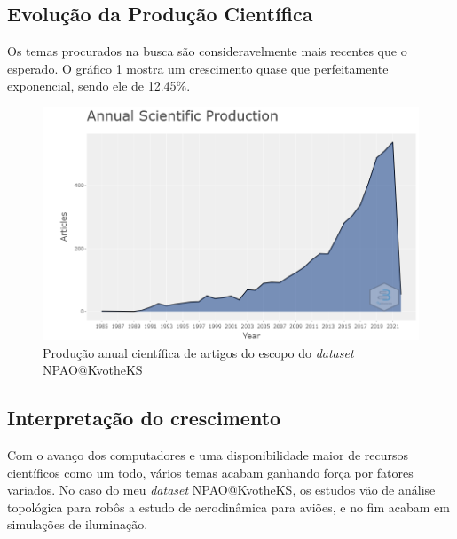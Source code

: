 \subsection{Evolução da Produção Científica}
    Os temas procurados na busca são consideravelmente mais recentes que o esperado. O gráfico \ref{fig:KvotheKS:Annual_Scientific} mostra um crescimento quase que perfeitamente exponencial, sendo ele de 12.45\%.
    \begin{figure}[H]
    \centering
    \includegraphics[width=1\textwidth]{experiments/KvotheKS/PesqBibliogr/AlgoritmosSimulacaoOptica-Dinamica/WoS-20220202/Dataset/Annual_Scientific.png}
    \caption{Produção anual científica de artigos do escopo do \emph{dataset} NPAO@KvotheKS}
    \label{fig:KvotheKS:Annual_Scientific}
\end{figure}
\subsection{Interpretação do crescimento}
    Com o avanço dos computadores e uma disponibilidade maior de recursos científicos como um todo, vários temas acabam ganhando força por fatores variados. No caso do meu \emph{dataset} NPAO@KvotheKS, os estudos vão de análise topológica para robôs a estudo de aerodinâmica para aviões, e no fim acabam em simulações de iluminação.
